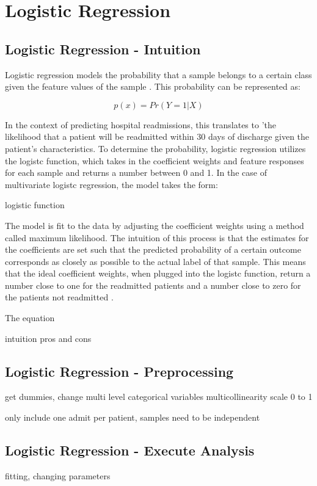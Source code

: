 \documentclass[sigconf]{acmart}
\begin{document}
\section{Logistic Regression}

\subsection{Logistic Regression - Intuition}

Logistic regression models the probability that a sample belongs to a certain class given the feature values of the sample \cite{cite08}. This probability can be represented as:

\[
p(x) = Pr(Y = 1 | X)
\]

In the context of predicting hospital readmissions, this translates to 'the likelihood that a patient will be readmitted within 30 days of discharge given the patient's characteristics. To determine the probability, logistic regression utilizes the logistc function, which takes in the coefficient weights and feature responses for each sample and returns a number between 0 and 1\cite{cite08}. In the case of multivariate logistc regression, the model takes the form:

logistic function

The model is fit to the data by adjusting the coefficient weights using a method called maximum likelihood. The intuition of this process is that the estimates for the coefficients are set such that the predicted probability of a certain outcome corresponds as closely as possible to the actual label of that sample. This means that the ideal coefficient weights, when plugged into the logistc function, return a number close to one for the readmitted patients and a number close to zero for the patients not readmitted \cite{cite08}.

The equation  \cite{cite08}

intuition
pros and cons

\subsection{Logistic Regression - Preprocessing}
get dummies, change multi level categorical variables
multicollinearity
scale 0 to 1

only include one admit per patient, samples need to be independent

\subsection{Logistic Regression - Execute Analysis}
fitting, changing parameters
\end{document}
